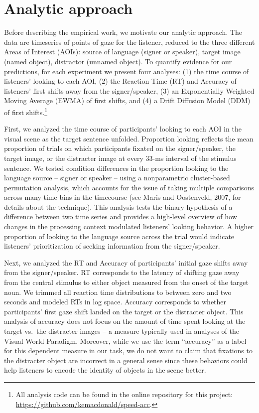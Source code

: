\documentclass[,man,floatsintext]{apa6}
\let\rmarkdownfootnote\footnote%
\def\footnote{\protect\rmarkdownfootnote}
\begin{document}
\section{Analytic approach}\label{analytic-approach}

Before describing the empirical work, we motivate our analytic approach.
The data are timeseries of points of gaze for the listener, reduced to
the three different Areas of Interest (AOIs): source of language (signer
or speaker), target image (named object), distractor (unnamed object).
To quantify evidence for our predictions, for each experiment we present
four analyses: (1) the time course of listeners' looking to each AOI,
(2) the Reaction Time (RT) and Accuracy of listeners' first shifts away
from the signer/speaker, (3) an Exponentially Weighted Moving Average
(EWMA) of first shifts, and (4) a Drift Diffusion Model (DDM) of first
shifts.\footnote{All analysis code can be found in the online repository
  for this project: \url{https://github.com/kemacdonald/speed-acc}.}

First, we analyzed the time course of participants' looking to each AOI
in the visual scene as the target sentence unfolded. Proportion looking
reflects the mean proportion of trials on which participants fixated on
the signer/speaker, the target image, or the distracter image at every
33-ms interval of the stimulus sentence. We tested condition differences
in the proportion looking to the language source -- signer or speaker --
using a nonparametric cluster-based permutation analysis, which accounts
for the issue of taking multiple comparisons across many time bins in
the timecourse (see Maris and Oostenveld, 2007, for details about the
technique). This analysis tests the binary hypothesis of a difference
between two time series and provides a high-level overview of how
changes in the processing context modulated listeners' looking behavior.
A higher proportion of looking to the language source across the trial
would indicate listeners' prioritization of seeking information from the
signer/speaker.

Next, we analyzed the RT and Accuracy of participants' initial gaze
shifts away from the signer/speaker. RT corresponds to the latency of
shifting gaze away from the central stimulus to either object measured
from the onset of the target noun. We trimmed all reaction time
distributions to between zero and two seconds and modeled RTs in log
space. Accuracy corresponds to whether participants' first gaze shift
landed on the target or the distracter object. This analysis of accuracy
does not focus on the amount of time spent looking at the target vs.~the
distracter images -- a measure typically used in analyses of the Visual
World Paradigm. Moreover, while we use the term \enquote{accuracy} as a
label for this dependent measure in our task, we do not want to claim
that fixations to the distracter object are incorrect in a general sense
since these behaviors could help listeners to encode the identity of
objects in the scene better.
\end{document}
